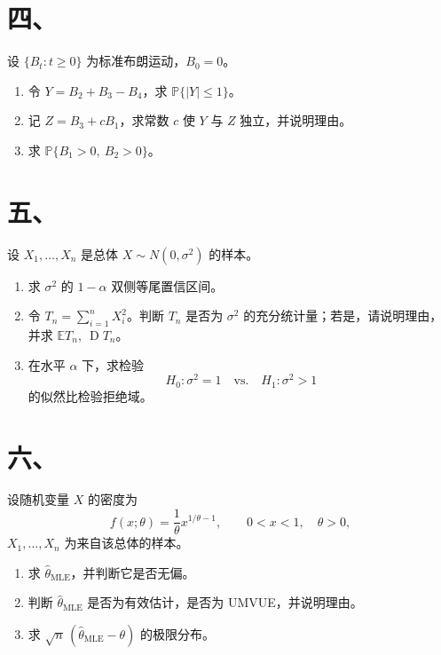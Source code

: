 \documentclass[UTF8,zihao=-4,fontset=windows]{ctexart}
\newcommand{\Prob}{\mathbb P}
\newcommand{\EX}{\mathbb E}
\newcommand{\DD}{\operatorname D}
\begin{document}
\section*{四、}
设 $\{B_t:t\ge 0\}$ 为标准布朗运动，$B_0=0$。
\begin{enumerate}
  \item 令 $Y=B_2+B_3-B_4$，求 $\Prob\{|Y|\le 1\}$。
  \item 记 $Z=B_3+cB_1$，求常数 $c$ 使 $Y$ 与 $Z$ 独立，并说明理由。
  \item 求 $\Prob\{B_1>0,\ B_2>0\}$。
\end{enumerate}

\section*{五、}
设 $X_1,\ldots,X_n$ 是总体 $X\sim N(0,\sigma^2)$ 的样本。
\begin{enumerate}
  \item 求 $\sigma^2$ 的 $1-\alpha$ 双侧等尾置信区间。
  \item 令 $T_n=\sum_{i=1}^n X_i^2$。判断 $T_n$ 是否为 $\sigma^2$ 的充分统计量；若是，请说明理由，并求 $\EX T_n,\ \DD T_n$。
  \item 在水平 $\alpha$ 下，求检验
  \[
    H_0:\sigma^2=1\quad \text{vs.}\quad H_1:\sigma^2>1
  \]
  的似然比检验拒绝域。
\end{enumerate}

\section*{六、}
设随机变量 $X$ 的密度为
\[
  f(x;\theta)=\frac1\theta x^{1/\theta-1},\qquad 0<x<1,\quad \theta>0,
\]
$X_1,\ldots,X_n$ 为来自该总体的样本。
\begin{enumerate}
  \item 求 $\hat\theta_{\mathrm{MLE}}$，并判断它是否无偏。
  \item 判断 $\hat\theta_{\mathrm{MLE}}$ 是否为有效估计，是否为 UMVUE，并说明理由。
  \item 求 $\sqrt n\,(\hat\theta_{\mathrm{MLE}}-\theta)$ 的极限分布。
\end{enumerate}
\end{document}

